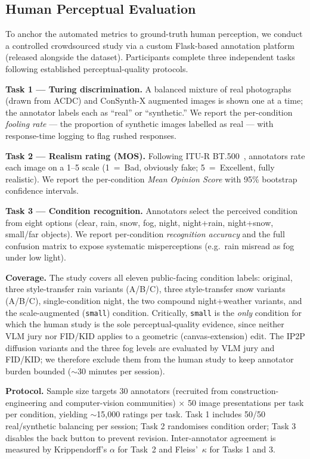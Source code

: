 \documentclass[12pt]{article}
\begin{document}
\subsection{Human Perceptual Evaluation}
\label{sec:human-eval}

To anchor the automated metrics to ground-truth human perception, we conduct a controlled crowdsourced study via a custom Flask-based annotation platform (released alongside the dataset). Participants complete three independent tasks following established perceptual-quality protocols.

\textbf{Task 1 --- Turing discrimination.} A balanced mixture of real photographs (drawn from ACDC) and ConSynth-X augmented images is shown one at a time; the annotator labels each as ``real'' or ``synthetic.'' We report the per-condition \emph{fooling rate} --- the proportion of synthetic images labelled as real --- with response-time logging to flag rushed responses.

\textbf{Task 2 --- Realism rating (MOS).} Following ITU-R BT.500~\citep{itu_bt500}, annotators rate each image on a 1--5 scale (1~=~Bad, obviously fake; 5~=~Excellent, fully realistic). We report the per-condition \emph{Mean Opinion Score} with 95\% bootstrap confidence intervals.

\textbf{Task 3 --- Condition recognition.} Annotators select the perceived condition from eight options (clear, rain, snow, fog, night, night+rain, night+snow, small/far objects). We report per-condition \emph{recognition accuracy} and the full confusion matrix to expose systematic misperceptions (e.g.\ rain misread as fog under low light).

\textbf{Coverage.} The study covers all eleven public-facing condition labels: original, three style-transfer rain variants (A/B/C), three style-transfer snow variants (A/B/C), single-condition night, the two compound night+weather variants, and the scale-augmented (\texttt{small}) condition. Critically, \texttt{small} is the \emph{only} condition for which the human study is the sole perceptual-quality evidence, since neither VLM jury nor FID/KID applies to a geometric (canvas-extension) edit. The IP2P diffusion variants and the three fog levels are evaluated by VLM jury and FID/KID; we therefore exclude them from the human study to keep annotator burden bounded ($\sim$30 minutes per session).

\textbf{Protocol.} Sample size targets 30 annotators (recruited from construction-engineering and computer-vision communities) $\times$ 50 image presentations per task per condition, yielding $\sim$15{,}000 ratings per task. Task 1 includes 50/50 real/synthetic balancing per session; Task 2 randomises condition order; Task 3 disables the back button to prevent revision. Inter-annotator agreement is measured by Krippendorff's $\alpha$ for Task~2 and Fleiss'~$\kappa$ for Tasks 1 and 3.
\end{document}
